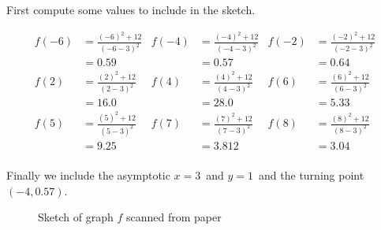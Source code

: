 \documentclass{article}
\begin{document}
First compute some values to include in the sketch.

\begin{align*}
f(-6) &= \frac{(-6)^2 + 12}{(-6-3)^2} & 
f(-4) &= \frac{(-4)^2 + 12}{(-4-3)^2} & 
f(-2) &= \frac{(-2)^2 + 12}{(-2-3)^2} \\
     &= 0.59&
     &= 0.57&
     &= 0.64\\
f(2) &= \frac{(2)^2 + 12}{(2-3)^2} &
f(4) &= \frac{(4)^2 + 12}{(4-3)^2} & 
f(6) &= \frac{(6)^2 + 12}{(6-3)^2} \\
     &= 16.0&
     &= 28.0&
     &= 5.33\\
f(5) &= \frac{(5)^2 + 12}{(5-3)^2} &
f(7) &= \frac{(7)^2 + 12}{(7-3)^2} & 
f(8) &= \frac{(8)^2 + 12}{(8-3)^2} \\
     &= 9.25&
     &= 3.812&
     &= 3.04\\
\end{align*}

Finally we include the asymptotic $x=3$ and $y=1$ and the turning point $(-4,0.57)$.

\begin{figure}[H]
    \centering
    \label{fig:sketch}
    \caption{Sketch of graph $f$ scanned from paper}
\end{figure}
\end{document}
